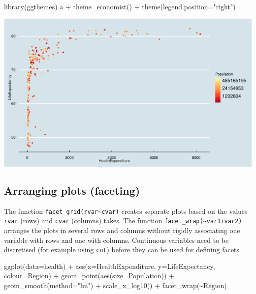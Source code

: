 \documentclass[
]{book}
\newenvironment{Shaded}{\begin{snugshade}}{\end{snugshade}}
\newcommand{\AttributeTok}[1]{\textcolor[rgb]{0.77,0.63,0.00}{#1}}
\newcommand{\FunctionTok}[1]{\textcolor[rgb]{0.00,0.00,0.00}{#1}}
\newcommand{\NormalTok}[1]{#1}
\newcommand{\SpecialCharTok}[1]{\textcolor[rgb]{0.00,0.00,0.00}{#1}}
\newcommand{\StringTok}[1]{\textcolor[rgb]{0.31,0.60,0.02}{#1}}
\begin{document}
\begin{Shaded}
\begin{Highlighting}[]
\FunctionTok{library}\NormalTok{(ggthemes)}
\NormalTok{a }\SpecialCharTok{+} \FunctionTok{theme\_economist}\NormalTok{() }\SpecialCharTok{+} \FunctionTok{theme}\NormalTok{(}\AttributeTok{legend.position=}\StringTok{"right"}\NormalTok{)}
\end{Highlighting}
\end{Shaded}

\includegraphics[width=\textwidth]{bookdown-demo_files/figure-latex/unnamed-chunk-64-2}

\hypertarget{arranging-plots-faceting}{%
\subsection{Arranging plots (faceting)}\label{arranging-plots-faceting}}

The function \texttt{facet\_grid(rvar\textasciitilde{}cvar)} creates separate plots based on the values \texttt{rvar} (rows) and \texttt{cvar} (columns) takes. The function \texttt{facet\_wrap(\textasciitilde{}var1+var2)} arranges the plots in several rows and columns without rigidly associating one variable with rows and one with columns. Continuous variables need to be discretised (for example using \texttt{cut}) before they can be used for defining facets.

\begin{Shaded}
\begin{Highlighting}[]
\FunctionTok{ggplot}\NormalTok{(}\AttributeTok{data=}\NormalTok{health) }\SpecialCharTok{+} 
    \FunctionTok{aes}\NormalTok{(}\AttributeTok{x=}\NormalTok{HealthExpenditure,  }\AttributeTok{y=}\NormalTok{LifeExpectancy, }\AttributeTok{colour=}\NormalTok{Region) }\SpecialCharTok{+}
    \FunctionTok{geom\_point}\NormalTok{(}\FunctionTok{aes}\NormalTok{(}\AttributeTok{size=}\NormalTok{Population)) }\SpecialCharTok{+}
    \FunctionTok{geom\_smooth}\NormalTok{(}\AttributeTok{method=}\StringTok{"lm"}\NormalTok{)  }\SpecialCharTok{+}
    \FunctionTok{scale\_x\_log10}\NormalTok{() }\SpecialCharTok{+}
    \FunctionTok{facet\_wrap}\NormalTok{(}\SpecialCharTok{\textasciitilde{}}\NormalTok{Region)}
\end{Highlighting}
\end{Shaded}
\end{document}
